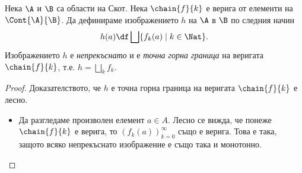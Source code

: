 \begin{framed}
  \begin{lemma}
    Нека $\A$ и $\B$ са области на Скот.
    Нека $\chain{f}{k}$ е верига от елементи на $\Cont{\A}{\B}$.
    Да дефинираме изображението $h$ на $\A$ в $\B$ по следния начин
    \[h(a) \df \bigsqcup\{f_k(a) \mid k \in \Nat\}.\]
    Изображението $h$ е {\em непрекъснато} и е {\em точна горна граница} на веригата $\chain{f}{k}$,
    т.е. $h = \bigsqcup_k f_k$.
  \end{lemma}
\end{framed}
\begin{proof}
  \ifhints
  Доказателството, че $h$ е точна горна граница на веригата $\chain{f}{k}$ е лесно.
  \begin{itemize}
  \item 
    Да разгледаме произволен елемент $a \in A$.
    Лесно се вижда, че понеже $\chain{f}{k}$ е верига, то $(f_k(a))^\infty_{k=0}$ също е верига.
    Това е така, защото всяко непрекъснато изображение е също така и монотонно.


\end{itemize}
\end{proof}

